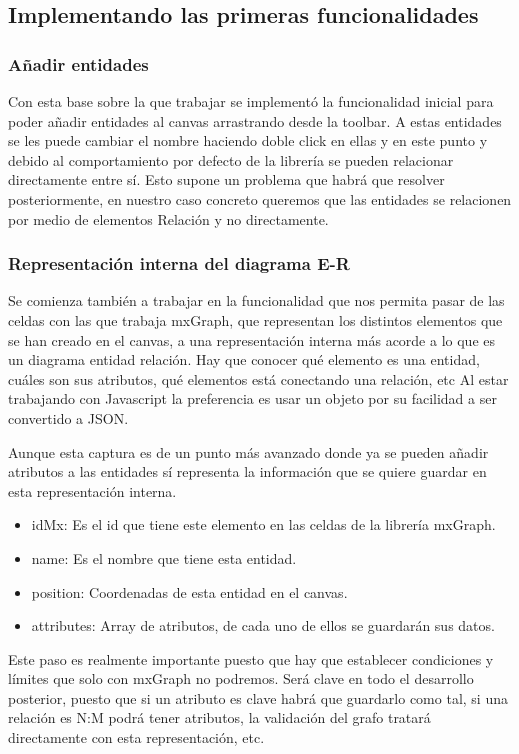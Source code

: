 
\subsection{Implementando las primeras funcionalidades}
\subsubsection{Añadir entidades}
Con esta base sobre la que trabajar se implementó la funcionalidad inicial para poder añadir entidades al canvas arrastrando desde la toolbar.
A estas entidades se les puede cambiar el nombre haciendo doble click en ellas y en este punto y debido al comportamiento por defecto de la librería se pueden relacionar directamente entre sí. 
Esto supone un problema que habrá que resolver posteriormente, en nuestro caso concreto queremos que las entidades se relacionen por medio de elementos Relación y no directamente.


\subsubsection{Representación interna del diagrama E-R}
Se comienza también a trabajar en la funcionalidad que nos permita pasar de las celdas con las que trabaja mxGraph, que representan los distintos elementos que se han creado en el canvas, a una representación interna más acorde a lo que es un diagrama entidad relación. Hay que conocer qué elemento es una entidad, cuáles son sus atributos, qué elementos está conectando una relación, etc
Al estar trabajando con Javascript la preferencia es usar un objeto por su facilidad a ser convertido a JSON.


Aunque esta captura es de un punto más avanzado donde ya se pueden añadir atributos a las entidades sí representa la información que se quiere guardar en esta representación interna.
\begin{itemize}\tightlist
    \item idMx: Es el id que tiene este elemento en las celdas de la librería mxGraph.
    \item name: Es el nombre que tiene esta entidad.
    \item position: Coordenadas de esta entidad en el canvas.
    \item attributes: Array de atributos, de cada uno de ellos se guardarán sus datos.
\end{itemize}
Este paso es realmente importante puesto que hay que establecer condiciones y límites que solo con mxGraph no podremos. Será clave en todo el desarrollo posterior, puesto que si un atributo es clave habrá que guardarlo como tal, si una relación es N:M podrá tener atributos, la validación del grafo tratará directamente con esta representación, etc.

